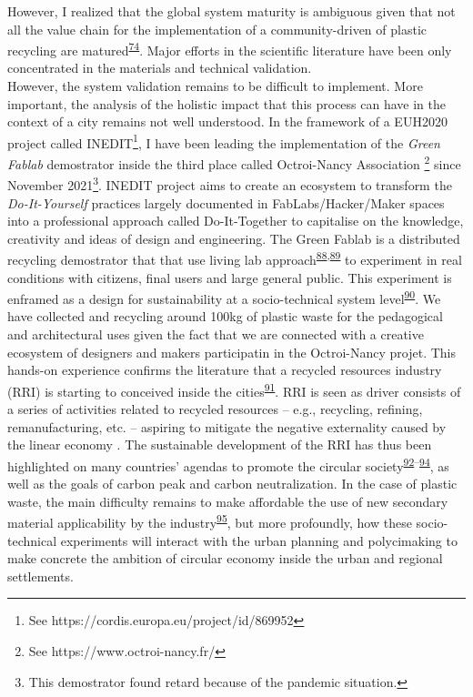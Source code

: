 \documentclass[
  11pt,
  a4paperpaper,
  onecolumn]{article}
\begin{document}
However, I realized that the global system maturity is ambiguous given
that not all the value chain for the implementation of a
community-driven of plastic recycling are
matured\textsuperscript{\protect\hyperlink{ref-CruzSanchez2020}{74}}.
Major efforts in the scientific literature have been only concentrated
in the materials and technical validation.\\
However, the system validation remains to be difficult to implement.
More important, the analysis of the holistic impact that this process
can have in the context of a city remains not well understood. In the
framework of a EUH2020 project called INEDIT\footnote{See
  https://cordis.europa.eu/project/id/869952}, I have been leading the
implementation of the \emph{Green Fablab} demostrator inside the third
place called Octroi-Nancy Association \footnote{See
  https://www.octroi-nancy.fr/} since November 2021\footnote{This
  demostrator found retard because of the pandemic situation.}. INEDIT
project aims to create an ecosystem to transform the
\emph{Do-It-Yourself} practices largely documented in
FabLabs/Hacker/Maker spaces into a professional approach called
Do-It-Together to capitalise on the knowledge, creativity and ideas of
design and engineering. The Green Fablab is a distributed recycling
demostrator that that use living lab
approach\textsuperscript{\protect\hyperlink{ref-tyl2021}{88},\protect\hyperlink{ref-compagnucci2020a}{89}}
to experiment in real conditions with citizens, final users and large
general public. This experiment is enframed as a design for
sustainability at a socio-technical system
level\textsuperscript{\protect\hyperlink{ref-Ceschin2016}{90}}. We have
collected and recycling around 100kg of plastic waste for the
pedagogical and architectural uses given the fact that we are connected
with a creative ecosystem of designers and makers participatin in the
Octroi-Nancy projet. This hands-on experience confirms the literature
that a recycled resources industry (RRI) is starting to conceived inside
the cities\textsuperscript{\protect\hyperlink{ref-wang2019b}{91}}. RRI
is seen as driver consists of a series of activities related to recycled
resources -- e.g., recycling, refining, remanufacturing, etc. --
aspiring to mitigate the negative externality caused by the linear
economy . The sustainable development of the RRI has thus been
highlighted on many countries' agendas to promote the circular
society\textsuperscript{\protect\hyperlink{ref-leipold2021}{92}--\protect\hyperlink{ref-jaeger-erben2021a}{94}},
as well as the goals of carbon peak and carbon neutralization. In the
case of plastic waste, the main difficulty remains to make affordable
the use of new secondary material applicability by the
industry\textsuperscript{\protect\hyperlink{ref-klotz2022}{95}}, but
more profoundly, how these socio-technical experiments will interact
with the urban planning and polycimaking to make concrete the ambition
of circular economy inside the urban and regional settlements.
\end{document}
